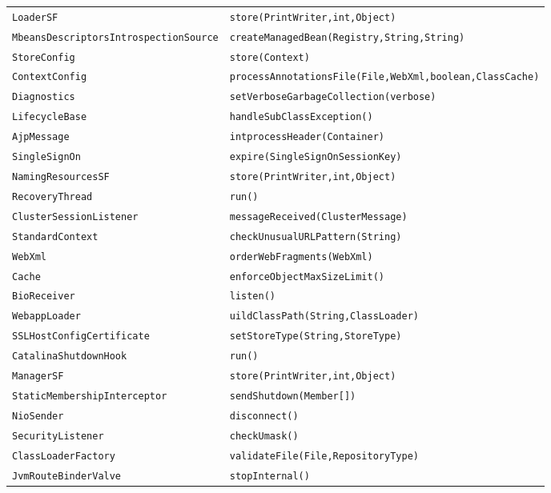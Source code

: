 \begin{center}
\begin{longtable}{ll}
 \lstinline/LoaderSF/&{\lstinline/store(PrintWriter,int,Object)/}\\
 \lstinline/MbeansDescriptorsIntrospectionSource/&{\lstinline/createManagedBean(Registry,String,String)/}\\
 \lstinline/StoreConfig/&{\lstinline/store(Context)/}\\
 \lstinline/ContextConfig/&{\lstinline/processAnnotationsFile(File,WebXml,boolean,ClassCache)/}\\
 \lstinline/Diagnostics/&{\lstinline/setVerboseGarbageCollection(verbose)/}\\
 \lstinline/LifecycleBase/&{\lstinline/handleSubClassException()/}\\
 \lstinline/AjpMessage/&{\lstinline/intprocessHeader(Container)/}\\
 \lstinline/SingleSignOn/&{\lstinline/expire(SingleSignOnSessionKey)/}\\
 \lstinline/NamingResourcesSF/&{\lstinline/store(PrintWriter,int,Object)/}\\
 \lstinline/RecoveryThread/&{\lstinline/run()/}\\
 \lstinline/ClusterSessionListener/&{\lstinline/messageReceived(ClusterMessage)/}\\
\lstinline/StandardContext/&{\lstinline/checkUnusualURLPattern(String)/}\\
 \lstinline/WebXml/&{\lstinline/orderWebFragments(WebXml)/}\\
 \lstinline/Cache/&{\lstinline/enforceObjectMaxSizeLimit()/}\\
 \lstinline/BioReceiver/&{\lstinline/listen()/}\\
 \lstinline/WebappLoader/&{\lstinline/uildClassPath(String,ClassLoader)/}\\
 \lstinline/SSLHostConfigCertificate/&{\lstinline/setStoreType(String,StoreType)/}\\
 \lstinline/CatalinaShutdownHook/&{\lstinline/run()/}\\
 \lstinline/ManagerSF/&{\lstinline/store(PrintWriter,int,Object)/}\\
 \lstinline/StaticMembershipInterceptor/&{\lstinline/sendShutdown(Member[])/}\\
 \lstinline/NioSender/&{\lstinline/disconnect()/}\\
 \lstinline/SecurityListener/&{\lstinline/checkUmask()/}\\
 \lstinline/ClassLoaderFactory/&{\lstinline/validateFile(File,RepositoryType)/}\\
 \lstinline/JvmRouteBinderValve/&{\lstinline/stopInternal()/}\\

\end{longtable}
\end{center}
